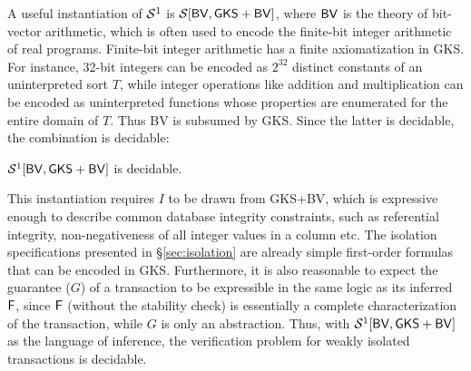 A useful instantiation of $\mathcal{S}^1$ is $\mathcal{S}[{\sf BV},{\sf GKS}+{\sf
BV}]$, where ${\sf BV}$ is the theory of bit-vector arithmetic, which
is often used to encode the finite-bit integer arithmetic of real
programs. Finite-bit integer arithmetic has a finite axiomatization in
{\sf GKS}. For instance, 32-bit integers can be encoded as $2^{32}$
distinct constants of an uninterpreted sort $T$, while integer
operations like addition and multiplication can be encoded as
uninterpreted functions whose properties are enumerated for the entire
domain of $T$. Thus {\sf BV} is subsumed by {\sf GKS}. Since the
latter is decidable, the combination is decidable:
\begin{theorem}
  $\mathcal{S}^1[{\sf BV},{\sf GKS}+{\sf BV}]$ is decidable.
\end{theorem}
This instantiation requires $I$ to be drawn from {\sf GKS}+{\sf BV},
which is expressive enough to describe common database integrity
constraints, such as referential integrity, non-negativeness of all
integer values in a column etc.  The isolation specifications
presented in \S\ref{sec:isolation} are already simple first-order
formulas that can be encoded in {\sf GKS}.  Furthermore, it is also
reasonable to expect the guarantee ($G$) of a transaction to be
expressible in the same logic as its inferred ${\sf F}$, since ${\sf F}$
(without the stability check) is essentially a complete
characterization of the transaction, while $G$ is only an abstraction.
Thus, with $\mathcal{S}^1[{\sf BV},{\sf GKS}+{\sf BV}]$ as the language of
inference, the verification problem for weakly isolated transactions
is decidable.


